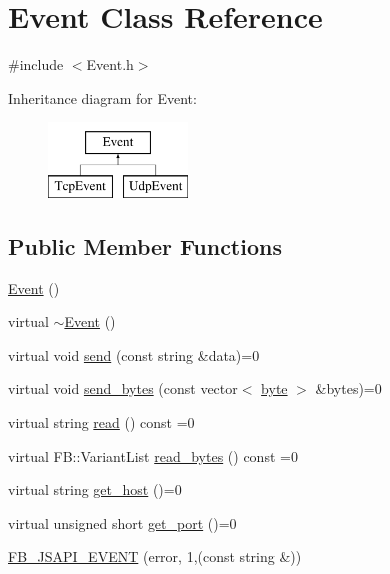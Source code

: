 \hypertarget{classEvent}{
\section{Event Class Reference}
\label{classEvent}
}


{\ttfamily \#include $<$Event.h$>$}

Inheritance diagram for Event:\begin{figure}[H]
\begin{center}
\leavevmode
\includegraphics[height=2.000000cm]{classEvent}
\end{center}
\end{figure}
\subsection*{Public Member Functions}
\begin{DoxyCompactItemize}
\item 
\hyperlink{classEvent_a5a40dd4708297f7031e29b39e039ae10}{Event} ()
\item 
virtual \hyperlink{classEvent_a7704ec01ce91e673885792054214b3d2}{$\sim$Event} ()
\item 
virtual void \hyperlink{classEvent_ac4eac8e7d44356632b59381929c8978c}{send} (const string \&data)=0
\item 
virtual void \hyperlink{classEvent_ac2183e14a4f65b18d046a5e082f68e71}{send\_\-bytes} (const vector$<$ \hyperlink{Event_8h_ae0aa21f6bcb621fe36c2c962aa0452fe}{byte} $>$ \&bytes)=0
\item 
virtual string \hyperlink{classEvent_a9e334d69556816ca38a8f21845d2a1cb}{read} () const =0
\item 
virtual FB::VariantList \hyperlink{classEvent_a04fa24d70fb7ec47e50e1a71bcedfe75}{read\_\-bytes} () const =0
\item 
virtual string \hyperlink{classEvent_ac3fe62061cb4e4552a91be17031fcc2d}{get\_\-host} ()=0
\item 
virtual unsigned short \hyperlink{classEvent_aa23b8454f931fcbe87ed61f1ec70b8e5}{get\_\-port} ()=0
\item 
\hyperlink{classEvent_ad77fd1b739e3291db3719f15dc44afb2}{FB\_\-JSAPI\_\-EVENT} (error, 1,(const string \&))
\end{DoxyCompactItemize}


